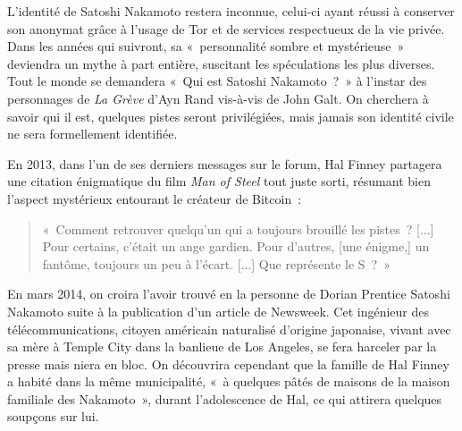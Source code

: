 
L'identité de Satoshi Nakamoto restera inconnue, celui-ci ayant réussi à conserver son anonymat grâce à l'usage de Tor et de services respectueux de la vie privée. Dans les années qui suivront, sa «~personnalité sombre et mystérieuse~» deviendra un mythe à part entière, suscitant les spéculations les plus diverses. Tout le monde se demandera «~Qui est Satoshi Nakamoto~?~» à l'instar des personnages de \emph{La Grève} d'Ayn Rand vis-à-vis de John Galt. On cherchera à savoir qui il est, quelques pistes seront privilégiées, mais jamais son identité civile ne sera formellement identifiée.

En 2013, dans l'un de ses derniers messages sur le forum, Hal Finney partagera une citation énigmatique du film \emph{Man of Steel} tout juste sorti, résumant bien l'aspect mystérieux entourant le créateur de Bitcoin~:

\begin{quote}
«~Comment retrouver quelqu'un qui a toujours brouillé les pistes~? [...] Pour certains, c'était un ange gardien. Pour d'autres, [une énigme,] un fantôme, toujours un peu à l'écart. [...] Que représente le S~?~» %
\end{quote} 

En mars 2014, on croira l'avoir trouvé en la personne de Dorian Prentice Satoshi Nakamoto suite à la publication d'un article de Newsweek. Cet ingénieur des télécommunications, citoyen américain naturalisé d'origine japonaise, vivant avec sa mère à Temple City dans la banlieue de Los Angeles, se fera harceler par la presse mais niera en bloc. On découvrira cependant que la famille de Hal Finney a habité dans la même municipalité, «~à quelques pâtés de maisons de la maison familiale des Nakamoto~», durant l'adolescence de Hal, ce qui attirera quelques soupçons sur lui.

